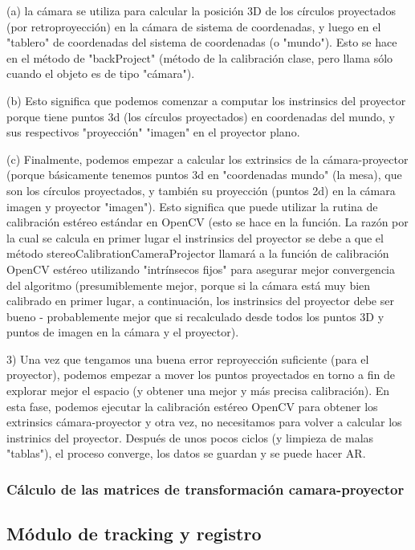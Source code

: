 (a) la cámara se utiliza para calcular la posición 3D de los círculos proyectados (por retroproyección) en la cámara de sistema de coordenadas, y luego en el "tablero" de coordenadas del sistema de coordenadas (o "mundo"). Esto se hace en el método de "backProject" (método de la calibración clase, pero llama sólo cuando el objeto es de tipo "cámara"). 

(b) Esto significa que podemos comenzar a computar los instrinsics del proyector porque tiene puntos 3d (los círculos proyectados) en coordenadas del mundo, y sus respectivos "proyección" "imagen" en el proyector plano. 

(c) Finalmente, podemos empezar a calcular los extrinsics de la cámara-proyector (porque básicamente tenemos puntos 3d en "coordenadas mundo" (la mesa), que son los círculos proyectados, y también su proyección (puntos 2d) en la cámara imagen y proyector "imagen"). Esto significa que puede utilizar la rutina de calibración estéreo estándar en OpenCV (esto se hace en la función. La razón por la cual se calcula en primer lugar el instrinsics del proyector se debe a que el método stereoCalibrationCameraProjector llamará a la función de calibración OpenCV estéreo utilizando "intrínsecos fijos" para asegurar mejor convergencia del algoritmo (presumiblemente mejor, porque si la cámara está muy bien calibrado en primer lugar, a continuación, los instrinsics del proyector debe ser bueno - probablemente mejor que si recalculado desde todos los puntos 3D y puntos de imagen en la cámara y el proyector). 

3) Una vez que tengamos una buena error reproyección suficiente (para el proyector), podemos empezar a mover los puntos proyectados en torno a fin de explorar mejor el espacio (y obtener una mejor y más precisa calibración). En esta fase, podemos ejecutar la calibración estéreo OpenCV para obtener los extrinsics cámara-proyector y otra vez, no necesitamos para volver a calcular los instrinics del proyector. Después de unos pocos ciclos (y limpieza de malas "tablas"), el proceso converge, los datos se guardan y se puede hacer AR. 

\subsubsection{Cálculo de las matrices de transformación camara-proyector}
\subsection{Módulo de tracking y registro}
